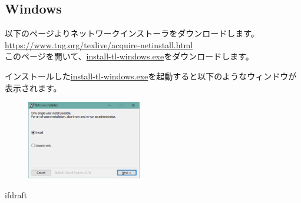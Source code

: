 		\subsection{Windows}
		    以下のページよりネットワークインストーラをダウンロードします。	\\
		    \url{https://www.tug.org/texlive/acquire-netinstall.html}	\\
            このページを開いて、\url{install-tl-windows.exe}をダウンロードします。
            
            インストールした\url{install-tl-windows.exe}を起動すると以下のようなウィンドウが表示されます。
			\begin{figure}[H]
				\centering
                \includegraphics[width=5cm]{unpacker1.png}
            \end{figure}

		    \expandafter\ifx\csname ifdraft\endcsname\relax

\fi